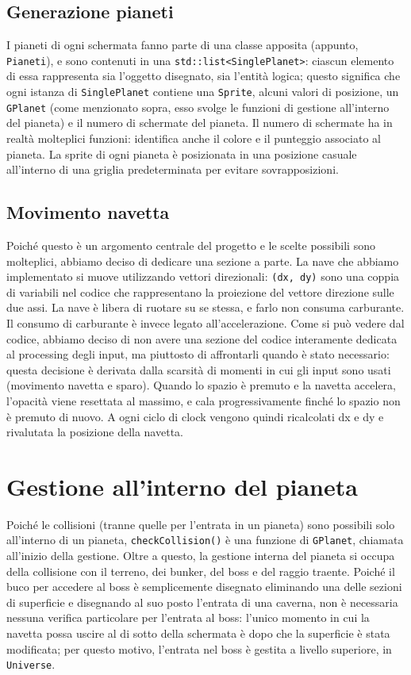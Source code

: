 \documentclass{article}
\begin{document}
\subsection{Generazione pianeti}
I pianeti di ogni schermata fanno parte di una classe apposita (appunto, \lstinline{Pianeti}), e sono contenuti in una \lstinline{std::list<SinglePlanet>}: ciascun elemento di essa rappresenta sia l'oggetto disegnato, sia l'entità logica; questo significa che ogni istanza di \lstinline{SinglePlanet} contiene una \lstinline{Sprite}, alcuni valori di posizione, un \lstinline{GPlanet} (come menzionato sopra, esso svolge le funzioni di gestione all'interno del pianeta) e il numero di schermate del pianeta. Il numero di schermate ha in realtà molteplici funzioni: identifica anche il colore e il punteggio associato al pianeta. La sprite di ogni pianeta è posizionata in una posizione casuale all'interno di una griglia predeterminata per evitare sovrapposizioni.
\subsection{Movimento navetta}
Poiché questo è un argomento centrale del progetto e le scelte possibili sono molteplici, abbiamo deciso di dedicare una sezione a parte. La nave che abbiamo implementato si muove utilizzando vettori direzionali: \lstinline{(dx, dy)} sono una coppia di variabili nel codice che rappresentano la proiezione del vettore direzione sulle due assi. La nave è libera di ruotare su se stessa, e farlo non consuma carburante. Il consumo di carburante è invece legato all'accelerazione. Come si può vedere dal codice, abbiamo deciso di non avere una sezione del codice interamente dedicata al processing degli input, ma piuttosto di affrontarli quando è stato necessario: questa decisione è derivata dalla scarsità di momenti in cui gli input sono usati (movimento navetta e sparo). Quando lo spazio è premuto e la navetta accelera, l'opacità viene resettata al massimo, e cala progressivamente finché lo spazio non è premuto di nuovo. A ogni ciclo di clock vengono quindi ricalcolati dx e dy e rivalutata la posizione della navetta. 
\section{Gestione all'interno del pianeta}
Poiché le collisioni (tranne quelle per l'entrata in un pianeta) sono possibili solo all'interno di un pianeta, \lstinline{checkCollision()} è una funzione di \lstinline{GPlanet}, chiamata all'inizio della gestione. Oltre a questo, la gestione interna del pianeta si occupa della collisione con il terreno, dei bunker, del boss e del raggio traente. Poiché il buco per accedere al boss è semplicemente disegnato eliminando una delle sezioni di superficie e disegnando al suo posto l'entrata di una caverna, non è necessaria nessuna verifica particolare per l'entrata al boss: l'unico momento in cui la navetta possa uscire al di sotto della schermata è dopo che la superficie è stata modificata; per questo motivo, l'entrata nel boss è gestita a livello superiore, in \lstinline{Universe}.
\end{document}

